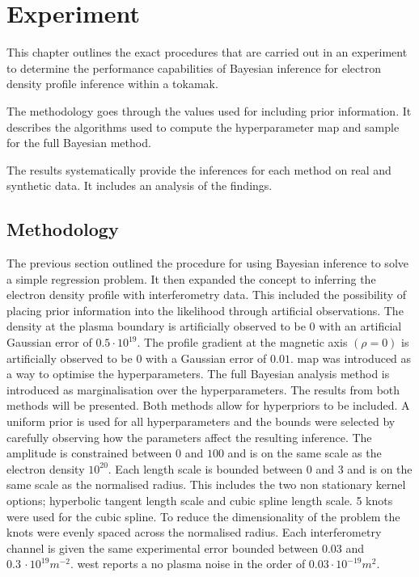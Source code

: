 \chapter{Experiment}

This chapter outlines the exact procedures that are carried out in an experiment to determine the performance capabilities of Bayesian inference for electron density profile inference within a tokamak.

The methodology goes through the values used for including prior information. It describes the algorithms used to compute the hyperparameter \gls{map} and sample for the full Bayesian method.

The results systematically provide the inferences for each method on real and synthetic data. It includes an analysis of the findings.

\section{Methodology}
The previous section outlined the procedure for using Bayesian inference to solve a simple regression problem. It then expanded the concept to inferring the electron density profile with interferometry data. This included the possibility of placing prior information into the likelihood through artificial observations. The density at the plasma boundary is artificially observed to be 0 with an artificial Gaussian error of $0.5 \cdot 10^{19}$. The profile gradient at the magnetic axis $(\rho=0)$ is artificially observed to be 0 with a Gaussian error of $0.01$. \gls{map} was introduced as a way to optimise the hyperparameters. The full Bayesian analysis method is introduced as marginalisation over the hyperparameters. The results from both methods will be presented. Both methods allow for hyperpriors to be included. A uniform prior is used for all hyperparameters and the bounds were selected by carefully observing how the parameters affect the resulting inference. The amplitude is constrained between $0$ and $100$ and is on the same scale as the electron density $10^{20}$. Each length scale is bounded between $0$ and $3$ and is on the same scale as the normalised radius. This includes the two non stationary kernel options; hyperbolic tangent length scale and cubic spline length scale. 5 knots were used for the cubic spline. To reduce the dimensionality of the problem the knots were evenly spaced across the normalised radius. Each interferometry channel is given the same experimental error bounded between $0.03$ and $0.3 \, \cdot 10^{19}m^{-2}$. \gls{west} reports a no plasma noise in the order of $0.03 \cdot10^{-19}m^2$. 

